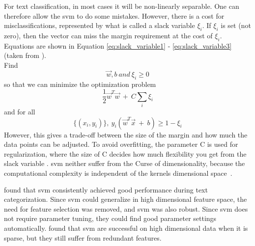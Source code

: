 For text classification, in most cases it will be non-linearly separable. 
One can therefore allow the \gls{svm} to do some mistakes.
However, there is a cost for misclassifications, represented by what is called a slack variable $\xi_{i}$.
If $\xi_{i}$ is set (not zero), then the vector can miss the margin requirement at the cost of $\xi_{i}$.
Equations are shown in Equation \ref{eq:slack_variable1} - \ref{eq:slack_variable3} (taken from \cite[p.~301]{Manning2008}). \\
Find
\begin{equation}\label{eq:slack_variable1}
\vec{w}, b~and~\xi_{i} \geq 0
\end{equation}
so that we can minimize the optimization problem
\begin{equation}\label{eq:slack_variable2}
\frac{1}{2}\vec{w}^{T}\vec{w}~+~C\sum_{i}\xi_{i}
\end{equation}
and for all
\begin{equation}\label{eq:slack_variable3}
\{(x_{i}, y_{i})\},~y_{i}(\vec{w}^{T}\vec{x}~+~b) \geq 1 - \xi_{i}
\end{equation}
However, this gives a trade-off between the size of the margin and how much the data points can be adjusted. 
To avoid overfitting, the parameter C is used for regularization, where the size of C decides how much flexibility you get from the slack variable \cite{Manning2008}.
\gls{svm} neither suffer from the Curse of dimensionality, because the computational complexity is independent of the kernels dimensional space~\cite{Theodoridis2009}.


%
%
%

\textcite{Joachims1998} found that \gls{svm} consistently achieved good performance during text categorization. 
Since \gls{svm} could generalize in high dimensional feature space, the need for feature selection was removed, and \gls{svm} was also robust. 
Since \gls{svm} does not require parameter tuning, they could find good parameter settings automatically. 
\textcite{Loni2011} found that \gls{svm} are successful on high dimensional data when it is sparse, but they still suffer from redundant features. 

